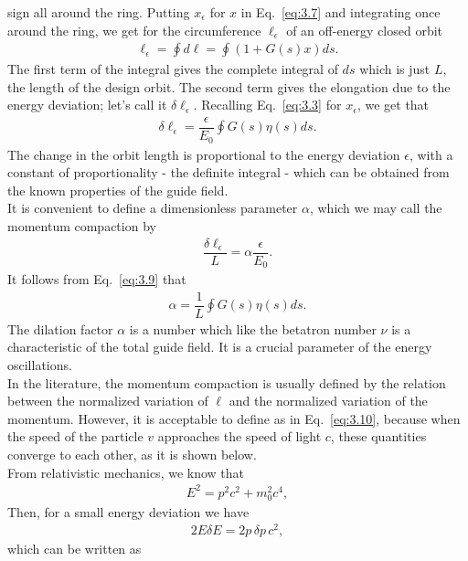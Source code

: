 sign all around the ring. Putting $x_\epsilon$ for $x$ in Eq.~\eqref{eq:3.7} and integrating
once around the ring, we get for the circumference $\ell_\epsilon$ of an off-energy
closed orbit
\begin{align}
	\ell_\epsilon = \oint d\ell = \oint (1 + G(s)x)ds.
\end{align}
The first term of the integral gives the complete integral of $ds$ which is just $L$, the length of the design orbit. The second term gives the elongation due to the energy deviation; let's call it $\delta \ell_\epsilon$. Recalling Eq.~\eqref{eq:3.3} for $x_\epsilon$, we get that
\begin{align} \label{eq:3.9}
	\delta\ell_\epsilon = \dfrac{\epsilon}{E_0} \oint G(s) \eta(s) ds.
\end{align}
The change in the orbit length is proportional to the energy deviation $\epsilon$, with a constant of proportionality - the definite integral - which can be obtained from the known properties of the guide field.\\
It is convenient to define a dimensionless parameter $\alpha$, which we may call the momentum compaction by
\begin{align}\label{eq:3.10}
	\dfrac{\delta \ell_\epsilon}{L} = \alpha \dfrac{\epsilon}{E_0}.
\end{align}
It follows from Eq.~\eqref{eq:3.9} that
\begin{align}\label{eq:3.11}
	\alpha = \dfrac{1}{L} \oint G(s) \eta(s) ds.
\end{align}
The dilation factor $\alpha$ is a number which like the betatron number $\nu$ is a characteristic of the total guide field. It is a crucial parameter of the energy oscillations.\\
In the literature, the momentum compaction is usually defined by the relation between the normalized variation of $\ell$ and the normalized variation of the momentum. However, it is acceptable to define as in Eq.~\eqref{eq:3.10}, because when the speed of the particle $v$ approaches the speed of light $c$, these quantities converge to each other, as it is shown below.\\
From relativistic mechanics, we know that
\begin{align}\label{eq:}
	E^2 = p^2c^2 + m_0^2 c^4,
\end{align}
Then, for a small energy deviation we have
\begin{align}
	2 E \delta E = 2p \,\delta p \, c^2,
\end{align}
which can be written as
